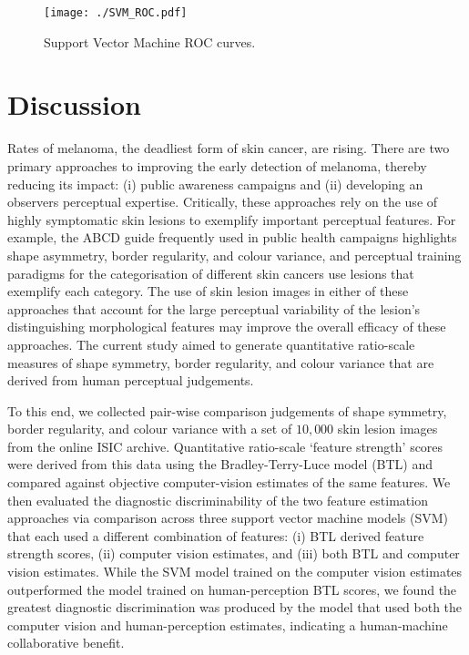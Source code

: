\documentclass[
    man, 12pt, a4paper,
    donotrepeattitle, floatsintext, draftfirst
]{apa7}
\begin{document}
\begin{figure}[tbh]
    \caption{Support Vector Machine ROC curves.}
    \label{fig:svm}
    \begin{center}
        \texttt{[image: ./SVM\_ROC.pdf]}
    \end{center}
\end{figure}

\section{Discussion}
Rates of melanoma, the deadliest form of skin cancer, are rising. There are two primary approaches to improving the early detection of melanoma, thereby reducing its impact: (i) public awareness campaigns and (ii) developing an observers perceptual expertise. Critically, these approaches rely on the use of highly symptomatic skin lesions to exemplify important perceptual features. For example, the ABCD guide frequently used in public health campaigns highlights shape asymmetry, border regularity, and colour variance, and perceptual training paradigms for the categorisation of different skin cancers use lesions that exemplify each category. The use of skin lesion images in either of these approaches that account for the large perceptual variability of the lesion's distinguishing morphological features may improve the overall efficacy of these approaches. The current study aimed to generate quantitative ratio-scale measures of shape symmetry, border regularity, and colour variance that are derived from human perceptual judgements.

To this end, we collected pair-wise comparison judgements of shape symmetry, border regularity, and colour variance with a set of $10,000$ skin lesion images from the online ISIC archive. Quantitative ratio-scale `feature strength' scores were derived from this data using the Bradley-Terry-Luce model (BTL) and compared against objective computer-vision estimates of the same features. We then evaluated the diagnostic discriminability of the two feature estimation approaches via comparison across three support vector machine models (SVM) that each used a different combination of features: (i) BTL derived feature strength scores, (ii) computer vision estimates, and (iii) both BTL and computer vision estimates. While the SVM model trained on the computer vision estimates outperformed the model trained on human-perception BTL scores, we found the greatest diagnostic discrimination was produced by the model that used both the computer vision and human-perception estimates, indicating a human-machine collaborative benefit.
\end{document}
